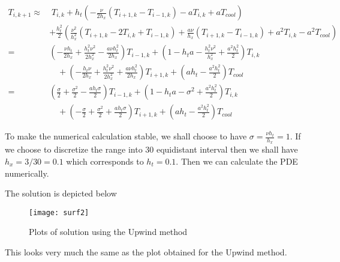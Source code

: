 \documentclass[11pt,a4paper,roman]{scrartcl}
\begin{document}
\begin{equation}
\begin{aligned}
T_{i,k+1} \approx & \;  T_{i,k} + h_t\left( -\frac{\nu}{2 h_x} (T_{i+1,k}-T_{i-1,k}) - a T_{i,k} + a T_{cool} \right) \\
& + \frac{h_t^2}{2} \left(\frac{\nu^2}{h_x^2}\left(T_{i+1,k}-2T_{i,k}+T_{i-1,k}\right) + \frac{a \nu }{h_x} (T_{i+1,k}-T_{i-1,k}) + a^2 T_{i,k} -a^2 T_{cool}\right) \\
= & \left(-\frac{\nu h_t}{2 h_x} + \frac{h_t^2\nu^2}{2 h_x^2} - \frac{a\nu h_t^2}{2 h_x} \right) T_{i-1,k} + \left(1-h_t a - \frac{h_t^2\nu^2}{h_x^2} + \frac{a^2h_t^2}{2} \right) T_{i,k} \\ 
& \quad + \left(-\frac{h_t\nu}{2h_x} + \frac{h_t^2\nu^2}{2 h_x^2}+ \frac{a\nu h_t^2}{2 h_x} \right) T_{i+1, k} + \left(a h_t-\frac{a^2h_t^2}{2}\right)T_{cool}\\
= & \left(\frac{\sigma}{2} + \frac{\sigma^2}{2} - \frac{a h_t \sigma}{2} \right) T_{i-1,k} + \left(1-h_t a - \sigma^2 + \frac{ a^2h_t^2}{2}\right) T_{i,k} \\ 
& \quad + \left(-\frac{\sigma}{2} + \frac{\sigma^2}{2} + \frac{a h_t \sigma}{2} \right) T_{i+1, k} + \left(a h_t-\frac{a^2h_t^2}{2}\right)T_{cool}
\end{aligned}
\end{equation}

To make the numerical calculation stable, we shall choose to have $\sigma  = \frac{\nu h_t}{h_x}= 1$. If we choose to discretize the range into 30 equidistant interval then we shall have $h_x = 3/30 = 0.1$ which corresponds to $h_t = 0.1$. Then we can calculate the PDE numerically.

The solution is depicted below

\begin{figure}[h]
\centering
\texttt{[image: surf2]}
\caption{Plots of solution using the Upwind method}
\end{figure}

This looks very much the same as the plot obtained for the Upwind method. 
\end{document}
